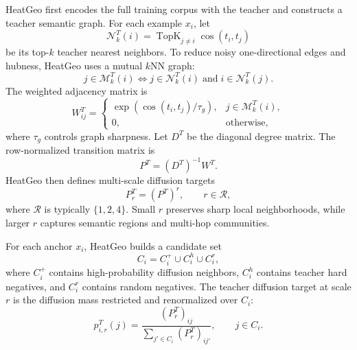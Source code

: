 HeatGeo first encodes the full training corpus with the teacher and constructs a teacher semantic graph. For each example $x_i$, let
\begin{equation}
    \mathcal{N}_k^T(i)
    =
    \operatorname{TopK}_{j\neq i}\cos(t_i,t_j)
\end{equation}
be its top-$k$ teacher nearest neighbors. To reduce noisy one-directional edges and hubness, HeatGeo uses a mutual $k$NN graph:
\begin{equation}
    j \in \mathcal{M}_k^T(i)
    \Longleftrightarrow
    j \in \mathcal{N}_k^T(i)
    \;\mathrm{and}\;
    i \in \mathcal{N}_k^T(j).
\end{equation}
The weighted adjacency matrix is
\begin{equation}
    W_{ij}^{T}
    =
    \begin{cases}
    \exp(\cos(t_i,t_j)/\tau_g), & j \in \mathcal{M}_k^T(i),\\
    0, & \mathrm{otherwise},
    \end{cases}
\end{equation}
where $\tau_g$ controls graph sharpness. Let $D^T$ be the diagonal degree matrix. The row-normalized transition matrix is
\begin{equation}
    P^T = (D^T)^{-1}W^T.
\end{equation}
HeatGeo then defines multi-scale diffusion targets
\begin{equation}
    P_r^T = (P^T)^r,
    \qquad r \in \mathcal{R},
\end{equation}
where $\mathcal{R}$ is typically $\{1,2,4\}$. Small $r$ preserves sharp local neighborhoods, while larger $r$ captures semantic regions and multi-hop communities.

For each anchor $x_i$, HeatGeo builds a candidate set
\begin{equation}
    C_i = C_i^{+} \cup C_i^{h} \cup C_i^{r},
\end{equation}
where $C_i^{+}$ contains high-probability diffusion neighbors, $C_i^{h}$ contains teacher hard negatives, and $C_i^{r}$ contains random negatives. The teacher diffusion target at scale $r$ is the diffusion mass restricted and renormalized over $C_i$:
\begin{equation}
    p_{i,r}^{T}(j)
    =
    \frac{(P_r^T)_{ij}}
    {\sum_{j' \in C_i}(P_r^T)_{ij'}},
    \qquad j\in C_i.
\end{equation}

